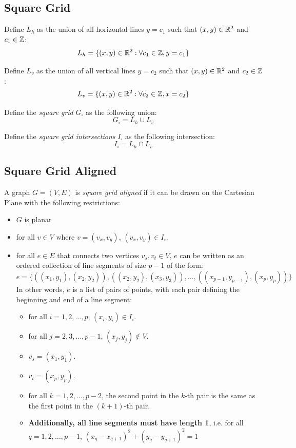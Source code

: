 \subsection{Square Grid}

Define $L_h$ as the union of all horizontal lines $y=c_1$ such that $(x,y) \in \mathbb{R}^2$ and $c_1 \in \mathbb{Z}$:
$$L_h = \{ (x, y) \in \mathbb{R}^2 : \forall c_1 \in \mathbb{Z}, y = c_1 \}$$

Define $L_v$ as the union of all vertical lines $y=c_2$ such that $(x,y) \in \mathbb{R}^2$ and $c_2 \in \mathbb{Z}$:
$$L_v = \{ (x, y) \in \mathbb{R}^2 : \forall c_2 \in \mathbb{Z}, x = c_2 \}$$

Define the \textit{square grid} $G_{\square}$ as the following union:
$$G_{\square} = L_h \cup L_v$$

Define the \textit{square grid intersections} $I_{\square}$ as the following intersection:
$$I_{\square} = L_h \cap L_v$$

\subsection{Square Grid Aligned}

A graph $G=(V,E)$ is \textit{square grid aligned} if it can be drawn on the Cartesian Plane with the following restrictions:
\begin{itemize}
    \item $G$ is planar
    \item for all $v \in V$ where $v = (v_x, v_y)$, $(v_x, v_y) \in I_{\square}$.
    \item for all $e \in E$ that connects two vertices $v_s, v_t \in V$, $e$ can be written as an ordered collection of line segments of size $p-1$ of the form:
    $$e = \{ \left( (x_1, y_1), (x_2, y_2) \right), \left( (x_2, y_2), (x_3, y_3) \right), \dots, \left( (x_{p-1}, y_{p-1}), (x_p, y_p) \right) \}$$
    In other words, $e$ is a list of pairs of points, with each pair defining the beginning and end of a line segment:
    \begin{itemize}[label=$\circ$]
        \item for all $i=1,2,\dots, p$, $(x_i, y_i) \in I_{\square}$.
        \item for all $j=2,3,\dots, p-1$, $(x_j, y_j) \notin V$.
        \item $v_s = (x_1, y_1)$.
        \item $v_t = (x_p, y_p)$.
        \item for all $k=1, 2, \dots, p-2$, the second point in the $k$-th pair is the same as the first point in the $(k+1)$-th pair.
        \item \textbf{Additionally, all line segments must have length 1}, i.e. \newline for all $q=1,2,\dots, p-1$, $(x_q - x_{q+1})^2 + (y_q - y_{q+1})^2 = 1$
    \end{itemize}
    
\end{itemize}


